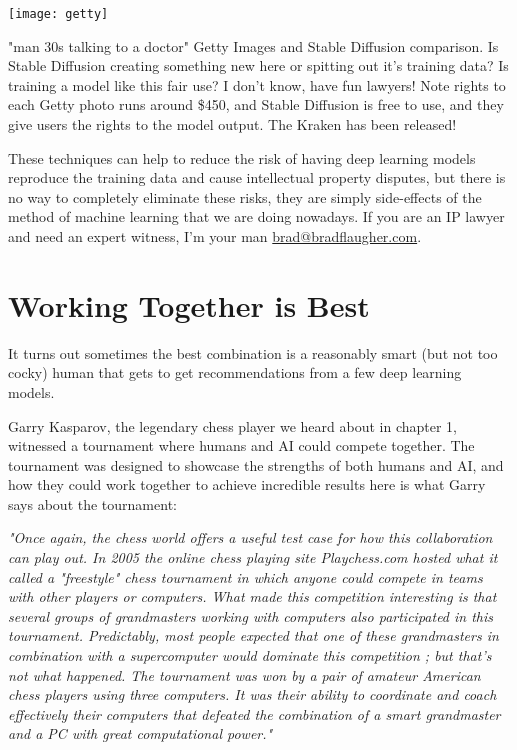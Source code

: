\begin{marginfigure}[-5.5cm]
        \texttt{[image: getty]}
        \caption{"man 30s talking to a doctor" Getty Images and Stable Diffusion comparison. Is Stable Diffusion creating something new here or spitting out it's training data? Is training a model like this fair use? I don't know, have fun lawyers! Note rights to each Getty photo runs around \$450, and Stable Diffusion is free to use, and they give users the rights to the model output. The Kraken has been released!}
\end{marginfigure}

These techniques can help to reduce the risk of having deep learning models reproduce the training data and cause intellectual property disputes, but there is no way to completely eliminate these risks, they are simply side-effects of the method of machine learning that we are doing nowadays. If you are an IP lawyer and need an expert witness, I'm your man \href{mailto:brad@bradflaugher.com}{brad@bradflaugher.com}.

\section{Working Together is Best}

It turns out sometimes the best combination is a reasonably smart (but not too cocky) human that gets to get recommendations from a few deep learning models. 

Garry Kasparov, the legendary chess player we heard about in chapter 1, witnessed a tournament where humans and AI could compete together. The tournament was designed to showcase the strengths of both humans and AI, and how they could work together to achieve incredible results here is what Garry says about the tournament:

\textit{"Once again, the chess world offers a useful test case for how this collaboration can play out. In 2005 the online chess playing site Playchess.com hosted what it called a "freestyle" chess tournament in which anyone could compete in teams with other players or computers. What made this competition interesting is that several groups of grandmasters working with computers also participated in this tournament. Predictably, most people expected that one of these grandmasters in combination with a supercomputer would dominate this competition ; but that's not what happened. The tournament was won by a pair of amateur American chess players using three computers. It was their ability to coordinate and coach effectively their computers that defeated the combination of a smart grandmaster and a PC with great computational power."}


